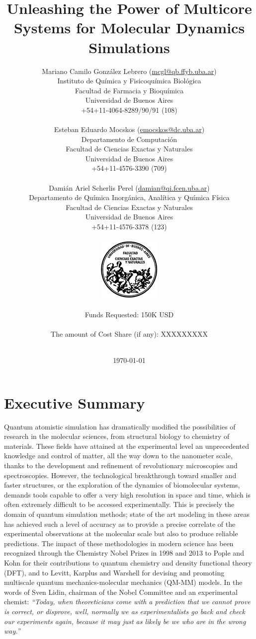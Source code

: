 \documentclass[a4paper,10pt]{article}
\title{\Huge Unleashing the Power of Multicore Systems for Molecular Dynamics Simulations}
\author{{\Large Mariano Camilo Gonz\'alez Lebrero} (\url{mcgl@qb.ffyb.uba.ar})\\
Instituto de Qu\'imica y Fisicoqu\'imica Biol\'ogica\\
Facultad de Farmacia y Bioqu\'imica\\
Universidad de Buenos Aires \\
+54+11-4064-8289/90/91 (108)\\
\\
{\Large Esteban Eduardo Mocskos} (\url{emocskos@dc.uba.ar})\\
Departamento de Computaci\'on\\
Facultad de Ciencias Exactas y Naturales\\
Universidad de Buenos Aires\\
+54+11-4576-3390 (709)\\
\\
{\Large Dami\'an Ariel Scherlis Perel} (\url{damian@qi.fcen.uba.ar})\\
Departamento de Qu\'imica Inorg\'anica, Anal\'itica y Qu\'imica F\'isica\\
Facultad de Ciencias Exactas y Naturales\\
Universidad de Buenos Aires\\
+54+11-4576-3378 (123)\\
\\
\includegraphics[keepaspectratio, width=3cm]{logofcen.pdf}\\
\\
Funds Requested: 150K USD \\
\\
The amount of Cost Share (if any): XXXXXXXXX\\
\\
}
\date{\today }
\begin{document}
\maketitle

\newpage

\section{Executive Summary}
%

Quantum atomistic simulation has dramatically modified the possibilities of research in the molecular sciences, from structural biology to chemistry of materials.
These fields have attained at the experimental level an unprecedented knowledge and control of matter, all the way down to the nanometer scale, thanks to the development and refinement of revolutionary microscopies and spectroscopies.
However, the technological breakthrough toward smaller and faster structures, or the exploration of the dynamics of biomolecular systems, demands tools capable to offer a very high resolution in space and time, which is often extremely difficult to be accessed experimentally.
This is precisely the domain of quantum simulation methods; state of the art modeling in these areas has achieved such a level of accuracy as to provide a precise correlate of the experimental observations at the molecular scale but also to produce reliable predictions.
The impact of these methodologies in modern science has been recognized through the Chemistry Nobel Prizes in 1998 and 2013 to Pople and Kohn for their contributions to quantum chemistry
and density functional theory (DFT), and to Levitt, Karplus and Warshell for devising and promoting multiscale quantum mechanics-molecular mechanics (QM-MM) models.
In the words of Sven Lidin, chairman of the Nobel Committee and an experimental chemist: \textsl{``Today, when theoreticians come with a prediction that we cannot prove is correct, or
disprove, well, normally we as experimentalists go back and check our experiments again, because it may just as likely be we who are in the wrong way.''}
\end{document}
